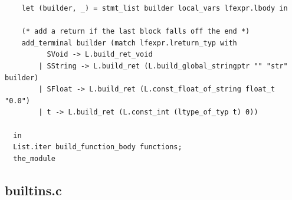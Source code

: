 \documentclass[12pt]{article}
\begin{document}
\begin{mdframed}[hidealllines=true,backgroundcolor=blue!20]
\begin{lstlisting}
    let (builder, _) = stmt_list builder local_vars lfexpr.lbody in

    (* add a return if the last block falls off the end *)
    add_terminal builder (match lfexpr.lreturn_typ with
          SVoid -> L.build_ret_void
        | SString -> L.build_ret (L.build_global_stringptr "" "str" builder)
        | SFloat -> L.build_ret (L.const_float_of_string float_t "0.0")
        | t -> L.build_ret (L.const_int (ltype_of_typ t) 0))

  in
  List.iter build_function_body functions;
  the_module
\end{lstlisting}
\end{mdframed}
\subsection{builtins.c}
\end{document}
